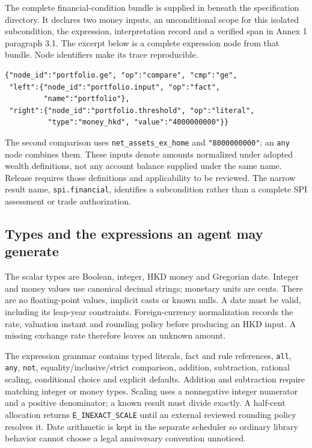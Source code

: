 The complete financial-condition bundle is supplied in
 beneath the specification directory.
It declares two money inputs, an unconditional scope for this isolated
subcondition, the expression, interpretation record and a verified span in
Annex 1 paragraph 3.1. The excerpt below is a complete expression node from
that bundle. Node identifiers make its trace reproducible.

\begin{minipage}{\textwidth}
\begin{lstlisting}[caption={The portfolio comparison in the supplied JSON bundle. Amounts are HK cents.}]
{"node_id":"portfolio.ge", "op":"compare", "cmp":"ge",
 "left":{"node_id":"portfolio.input", "op":"fact",
         "name":"portfolio"},
 "right":{"node_id":"portfolio.threshold", "op":"literal",
          "type":"money_hkd", "value":"4000000000"}}
\end{lstlisting}
\end{minipage}

The second comparison uses \texttt{net\_assets\_ex\_home} and
\texttt{"8000000000"}; an \texttt{any} node combines them. These inputs denote
amounts normalized under adopted wealth definitions, not any account balance
supplied under the same name. Release requires those definitions and applicability
to be reviewed. The narrow result name, \texttt{spi.financial}, identifies a
subcondition rather than a complete SPI assessment or trade authorization.

\subsection{Types and the expressions an agent may generate}
\label{merge:P-03a-rule-contract:00}


The scalar types are Boolean, integer, HKD money and Gregorian date. Integer
and money values use canonical decimal strings; monetary units are cents.
There are no floating-point values, implicit casts or known nulls. A date must
be valid, including its leap-year constraints. Foreign-currency normalization
records the rate, valuation instant and rounding policy before producing an HKD
input. A missing exchange rate therefore leaves an unknown amount.

The expression grammar contains typed literals, fact and rule references,
\texttt{all}, \texttt{any}, \texttt{not}, equality/inclusive/strict comparison,
addition, subtraction, rational scaling, conditional choice and explicit defaults.
Addition and subtraction require matching integer or money types. Scaling uses
a nonnegative integer numerator and a positive denominator; a known result must
divide exactly. A half-cent allocation returns \texttt{E\_INEXACT\_SCALE} until
an external reviewed rounding policy resolves it. Date arithmetic is kept in
the separate scheduler so ordinary library behavior cannot choose a legal
anniversary convention unnoticed.

